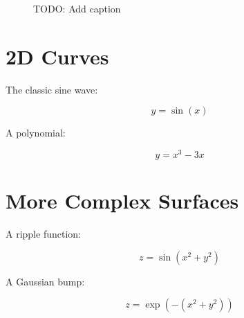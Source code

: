 \documentclass{article}
\newenvironment{viz}[1][]{\begin{equation}}{\end{equation}}
\begin{document}
\begin{figure}[h]
  \caption{TODO: Add caption}
  \label{fig:generated}
\end{figure}

\section{2D Curves}

The classic sine wave:

\begin{viz}[type=curve, label=Sine Wave, xrange=-6:6]
y = \sin(x)
\end{viz}



A polynomial:

\begin{viz}[type=curve, label=Cubic, xrange=-3:3]
y = x^3 - 3x
\end{viz}

\section{More Complex Surfaces}



A ripple function:

\begin{viz}[type=surface, label=Ripple, xrange=-4:4, yrange=-4:4]
z = \sin(x^2 + y^2)
\end{viz}

A Gaussian bump:

\begin{viz}[type=surface, label=Gaussian, xrange=-3:3, yrange=-3:3, colorscale=Plasma]
z = \exp(-(x^2 + y^2))
\end{viz}
\end{document}
